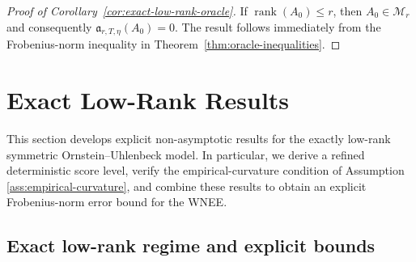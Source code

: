 \documentclass[11pt]{article}
\begin{document}
\begin{proof}[Proof of Corollary~\ref{cor:exact-low-rank-oracle}]
If $\operatorname{rank}(A_0)\leq r$, then
$A_0\in\mathcal M_r$ and consequently
$\mathfrak a_{r,T,\eta}(A_0)=0$. The result follows immediately from the
Frobenius-norm inequality in Theorem~\ref{thm:oracle-inequalities}.
\end{proof}










\section{Exact Low-Rank Results}
\label{sec:exact-low-rank}


This section develops explicit non-asymptotic results for the exactly low-rank symmetric Ornstein–Uhlenbeck model. In particular, we derive a refined deterministic score level, verify the empirical-curvature condition of Assumption \ref{ass:empirical-curvature}, and combine these results to obtain an explicit Frobenius-norm error bound for the WNEE.

\subsection{Exact low-rank regime and explicit bounds}
\label{subsec:exact-low-rank-regime}
\end{document}
